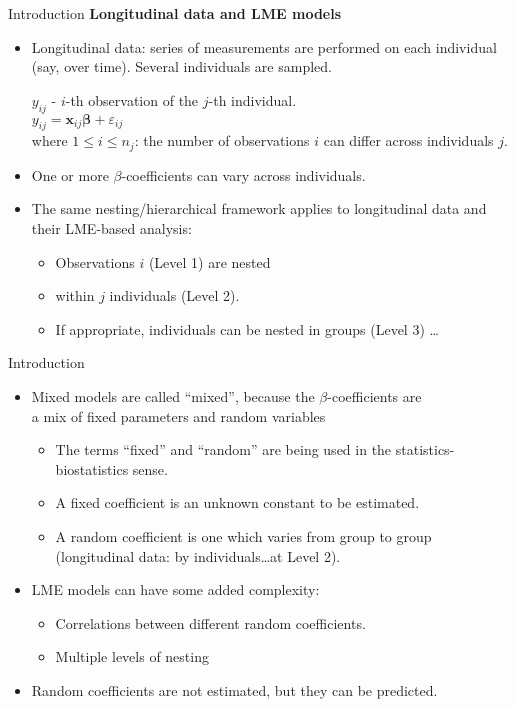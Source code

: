 \documentclass{beamer}
\begin{document}
\begin{frame}{Introduction}
\textbf{Longitudinal data and LME models}
\medskip
\begin{itemize}
\item Longitudinal data: series of measurements are performed on each individual (say, over time). Several individuals are sampled. \\ \medskip

$y_{ij}$ - $i$-th observation of the $j$-th individual. \\ \smallskip
\medskip
$y_{ij} =  \bm{x}_{ij}\bm{\beta} + \varepsilon_{ij}$\\
\medskip
where $ 1 \leq i \leq n_j$: the number of observations $i$ can differ across individuals $j$.\\ \bigskip
\item One or more $\beta$-coefficients can vary across individuals.
\bigskip
\item The same nesting/hierarchical framework applies to longitudinal data and their LME-based analysis:
\medskip
\begin{itemize}
    \item Observations $i$ (Level 1) are nested
    \smallskip
    \item within $j$ individuals (Level 2).
    \smallskip
    \item If appropriate, individuals can be nested in groups (Level 3) \dots 
\end{itemize}
\end{itemize}
\end{frame}
\begin{frame}{Introduction}
\begin{itemize}
\item Mixed models are called ``mixed'', because the $\beta$-coefficients are \\a mix of fixed parameters and random variables
\smallskip 
\begin{itemize}
\item The terms ``fixed'' and ``random'' are being used in the statistics-biostatistics sense.
\item A fixed coefficient is an unknown constant to be estimated.
\item A random coefficient is one which varies from group to group \\(longitudinal data: by individuals\dots at Level 2).
\end{itemize}
\smallskip
\item  LME models can have some added complexity:
\smallskip
\begin{itemize}
\item Correlations between different random coefficients.
\smallskip
\item Multiple levels of nesting
\end{itemize}
\smallskip
\item Random  coefficients are not estimated, but they can be predicted.
\end{itemize}
\end{frame}
\end{document}
